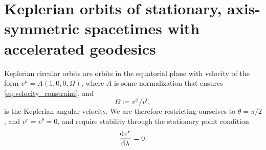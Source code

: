 \section{Keplerian orbits of stationary, axis-symmetric spacetimes with accelerated geodesics}
\label{appendix:circular-orbits}

Keplerian circular orbits are orbits in the equatorial plane with velocity of
the form $v^\mu = A(1, 0, 0, \Omega)$, where $A$ is some normalization that
ensures \eqref{eq:velocity_constraint}, and
\begin{equation}
    \label{eq:keplerian-angular-velocity}
    \Omega := v^\phi / v^t,
\end{equation}
is the Keplerian angular velocity. We are therefore restricting ourselves to
$\theta = \pi/2$, and $v^r = v^\theta = 0$, and require stability through the
stationary point condition
\begin{equation}
    \frac{\text{d} v^r}{\text{d} \lambda} = 0.
\end{equation}

